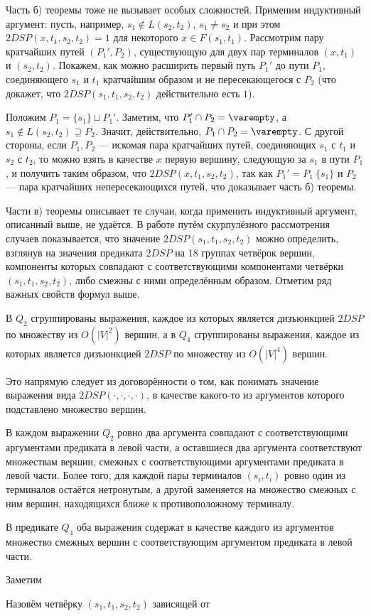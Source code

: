 Часть б) теоремы тоже не вызывает особых сложностей. Применим индуктивный аргумент: пусть, например, $s_1 \notin L(s_2, t_2)$, $s_1 \neq s_2$ и при этом $2DSP(x, t_1, s_2, t_2) = 1$ для некоторого $x \in F(s_1, t_1)$. Рассмотрим пару кратчайших путей $(P_1', P_2)$, существующую для двух пар терминалов $(x, t_1)$ и $(s_2, t_2)$. Покажем, как можно расширить первый путь $P_1'$ до пути $P_1$, соединяющего $s_1$ и $t_1$ кратчайшим образом и не пересекающегося с $P_2$ (что докажет, что $2DSP(s_1, t_1, s_2, t_2)$ действительно есть $1$).

Положим $P_1 = \{s_1\} \sqcup P_1'$. Заметим, что $P_1' \cap P_2 = \varempty$, а $s_1 \notin L(s_2, t_2) \supseteq P_2$. Значит, действительно, $P_1 \cap P_2 = \varempty$. С другой стороны, если $P_1, P_2$ --- искомая пара кратчайших путей, соединяющих $s_1$ с $t_1$ и $s_2$ с $t_2$, то можно взять в качестве $x$ первую вершину, следующую за $s_1$ в пути $P_1$, и получить таким образом, что $2DSP(x, t_1, s_2, t_2)$, так как $P_1' = P_1 \ \{s_1\}$ и $P_2$ --- пара кратчайших непересекающихся путей, что доказывает часть б) теоремы.

Части в) теоремы описывает те случаи, когда применить индуктивный аргумент, описанный выше, не удаётся. В работе \cite{ET} путём скурпулёзного рассмотрения случаев показывается, что значение $2DSP(s_1, t_1, s_2, t_2)$ можно определить, взглянув на значения предиката $2DSP$ на 18 группах четвёрок вершин, компоненты которых совпадают с соответствующими компонентами четвёрки $(s_1, t_1, s_2, t_2)$, либо смежны с ними определённым образом. Отметим ряд важных свойств формул выше.

\begin{proposition}
В $Q_2$ сгруппированы выражения, каждое из которых является дизъюнкцией $2DSP$ по множеству из $O(|V|^2)$ вершин, а в $Q_4$ сгруппированы выражения, каждое из которых является дизъюнкцией $2DSP$ по множеству из $O(|V|^4)$ вершин.
\end{proposition}

Это напрямую следует из договорённости о том, как понимать значение выражения вида $2DSP(\cdot,\cdot,\cdot,\cdot)$, в качестве какого-то из аргументов которого подставлено множество вершин.

\begin{proposition}
В каждом выражении $Q_2$ ровно два аргумента совпадают с соответствующими аргументами предиката в левой части, а оставшиеся два аргумента соответствуют множествам вершин, смежных с соответствующими аргументами предиката в левой части. Более того, для каждой пары терминалов $(s_i, t_i)$ ровно один из терминалов остаётся нетронутым, а другой заменяется на множество смежных с ним вершин, находящихся ближе к противоположному терминалу.
\end{proposition}

\begin{proposition}
В предикате $Q_4$ оба выражения содержат в качестве каждого из аргументов множество смежных вершин с соответствующим аргументом предиката в левой части.
\end{proposition}
Заметим

Назовём четвёрку $(s_1, t_1, s_2, t_2)$ зависящей от


